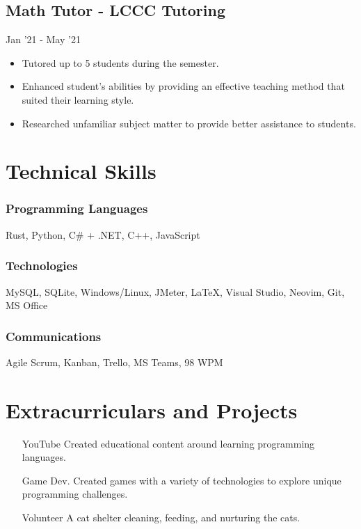 \documentclass{article}
\begin{document}
\subsection{Math Tutor - LCCC Tutoring} \hfill Jan '21 - May '21
\begin{itemize}
  \item Tutored up to 5 students during the semester.
  \item Enhanced student’s abilities by providing an effective teaching method that suited their learning style.
  \item Researched unfamiliar subject matter to provide better assistance to students.
\end{itemize}

\section{Technical Skills}

\subsubsection{Programming Languages} Rust, Python, C\# + .NET, C++, JavaScript

\subsubsection{Technologies} MySQL, SQLite, Windows/Linux, JMeter, {\LaTeX}, Visual Studio, Neovim, Git, MS Office

\subsubsection{Communications} Agile Scrum, Kanban, Trello, MS Teams,  98 WPM

\section{Extracurriculars and Projects}
\begin{itemize}
  \item[YouTube] Created educational content around learning programming languages.
  \item[Game Dev.] Created games with a variety of technologies to explore unique programming challenges.
  \item[Volunteer] A cat shelter cleaning, feeding, and nurturing the cats.
\end{itemize}

\thispagestyle{empty}
\end{document}
